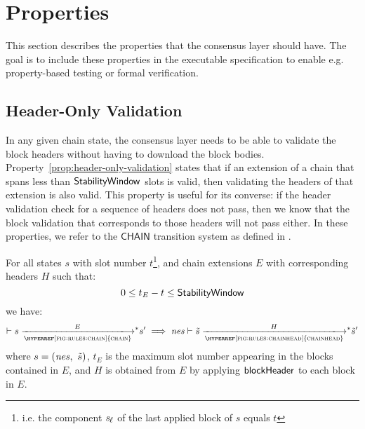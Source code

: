 \newcommand{\Val}{\fun{Val}}
\newcommand{\POV}[1]{\ensuremath{\mathsf{PresOfVal}(\mathsf{#1})}}
\newcommand{\DBE}[2]{\ensuremath{\mathsf{DBE}({#1},~{#2})}}
\newcommand{\DGO}[2]{\ensuremath{\mathsf{DGO}({#1},~{#2})}}
\newcommand{\transtar}[2]{\xlongrightarrow[\textsc{#1}]{#2}\negthickspace^{*}}

\section{Properties}
\label{sec:properties}

This section describes the properties that the consensus layer should have.
The goal is to include these properties in the executable specification
to enable e.g. property-based testing or formal verification.

\subsection{Header-Only Validation}
\label{sec:header-only-validation}
In any given chain state, the consensus layer needs to be able to validate the
block headers without having to download the block bodies.
Property~\ref{prop:header-only-validation} states that if an extension of a
chain that spans less than $\mathsf{StabilityWindow}$ slots is valid, then validating the
headers of that extension is also valid. This property is useful for its
converse: if the header validation check for a sequence of headers does not
pass, then we know that the block validation that corresponds to those headers
will not pass either. In these properties, we refer to the $\mathsf{CHAIN}$
transition system as defined in \cite{shelley_chain_spec}.

\begin{property}\label{prop:header-only-validation}
  For all states $s$ with slot number $t$\footnote{i.e. the
    component $\mathit{s_\ell}$ of the last applied block of $s$ equals $t$},
    and chain extensions $E$ with corresponding headers $H$ such that:
  $$
  0 \leq t_E - t  \leq \mathsf{StabilityWindow}
  $$
  we have:
  $$
  \vdash s \transtar{\hyperref[fig:rules:chain]{chain}}{E} s'
  \implies
  \var{nes} \vdash \tilde{s} \transtar{\hyperref[fig:rules:chainhead]{chainhead}}{H} \tilde{s}'
  $$
  where $s=(\mathit{nes},~\tilde{s})$,
  $t_E$ is the maximum slot number appearing in the blocks contained in
  $E$, and $H$ is obtained from $E$ by applying $\mathsf{blockHeader}$ to each block in $E$.
\end{property}

